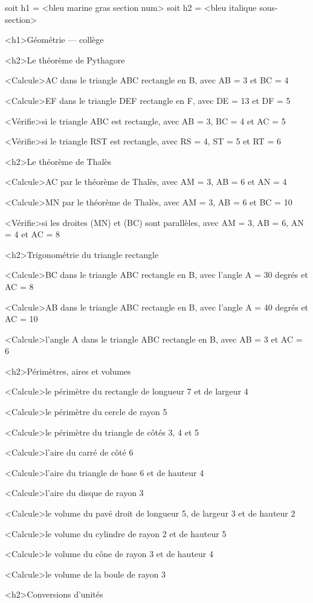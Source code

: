 \documentclass[marges=20, taille=11, precision=3]{texecole}
\begin{document}
soit h1 = <bleu marine gras section num>
soit h2 = <bleu italique sous-section>

<h1>Géométrie — collège

<h2>Le théorème de Pythagore

<Calcule>AC dans le triangle ABC rectangle en B, avec AB = 3 et BC = 4

<Calcule>EF dans le triangle DEF rectangle en F, avec DE = 13 et DF = 5

<Vérifie>si le triangle ABC est rectangle, avec AB = 3, BC = 4 et AC = 5

<Vérifie>si le triangle RST est rectangle, avec RS = 4, ST = 5 et RT = 6

<h2>Le théorème de Thalès

<Calcule>AC par le théorème de Thalès, avec AM = 3, AB = 6 et AN = 4

<Calcule>MN par le théorème de Thalès, avec AM = 3, AB = 6 et BC = 10

<Vérifie>si les droites (MN) et (BC) sont parallèles, avec AM = 3, AB = 6, AN = 4 et AC = 8

<h2>Trigonométrie du triangle rectangle

<Calcule>BC dans le triangle ABC rectangle en B, avec l'angle A = 30 degrés et AC = 8

<Calcule>AB dans le triangle ABC rectangle en B, avec l'angle A = 40 degrés et AC = 10

<Calcule>l'angle A dans le triangle ABC rectangle en B, avec AB = 3 et AC = 6

<h2>Périmètres, aires et volumes

<Calcule>le périmètre du rectangle de longueur 7 et de largeur 4

<Calcule>le périmètre du cercle de rayon 5

<Calcule>le périmètre du triangle de côtés 3, 4 et 5

<Calcule>l'aire du carré de côté 6

<Calcule>l'aire du triangle de base 6 et de hauteur 4

<Calcule>l'aire du disque de rayon 3

<Calcule>le volume du pavé droit de longueur 5, de largeur 3 et de hauteur 2

<Calcule>le volume du cylindre de rayon 2 et de hauteur 5

<Calcule>le volume du cône de rayon 3 et de hauteur 4

<Calcule>le volume de la boule de rayon 3

<h2>Conversions d'unités
\end{document}

